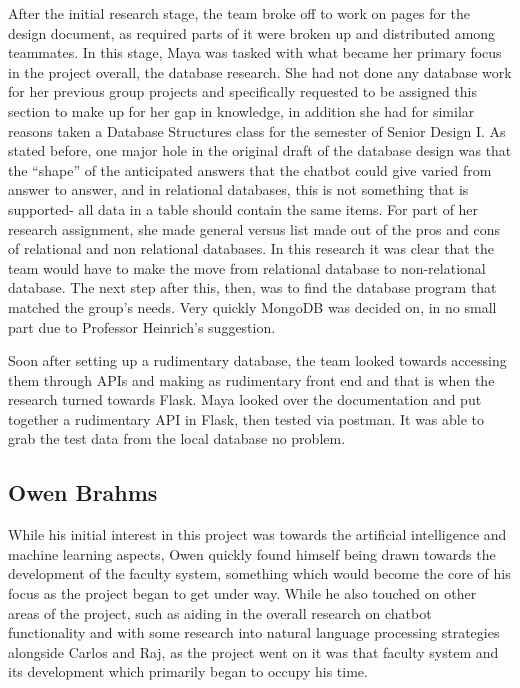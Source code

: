 \documentclass[titlepage, 12pt]{article}
\begin{document}
After the initial research stage, the team broke off to work on pages for the design document, as required parts of it were broken up and distributed among teammates. In this stage, Maya was tasked with what became her primary focus in the project overall, the database research. She had not done any database work for her previous group projects and specifically requested to be assigned this section to make up for her gap in knowledge, in addition she had for similar reasons taken a Database Structures class for the semester of Senior Design I. As stated before, one major hole in the original draft of the database design was that the “shape” of the anticipated answers that the chatbot could give varied from answer to answer, and in relational databases, this is not something that is supported- all data in a table should contain the same items. For part of her research assignment, she made general versus list made out of the pros and cons of relational and non relational databases. In this research it was clear that the team would have to make the move from relational database to non-relational database. The next step after this, then, was to find the database program that matched the group’s needs. Very quickly MongoDB was decided on, in no small part due to Professor Heinrich’s suggestion. 

Soon after setting up a rudimentary database, the team looked towards accessing them through APIs and making as rudimentary front end and that is when the research turned towards Flask. Maya looked over the documentation and put together a rudimentary API in Flask, then tested via postman. It was able to grab the test data from the local database no problem.



\subsection{Owen Brahms}

While his initial interest in this project was towards the artificial intelligence and machine learning aspects, Owen quickly found himself being drawn towards the development of the faculty system, something which would become the core of his focus as the project began to get under way. While he also touched on other areas of the project, such as aiding in the overall research on chatbot functionality and with some research into natural language processing strategies alongside Carlos and Raj, as the project went on it was that faculty system and its development which primarily began to occupy his time.
\end{document}
